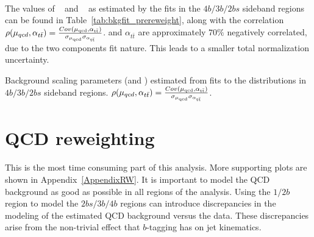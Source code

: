 \paragraph{}
The values of \muqcd~ and \alphatt~ as estimated by the fits in the $4b/3b/2bs$ sideband regions can be found in Table~\ref{tab:bkgfit_prereweight}, along with the correlation $\rho(\mu_{qcd},\alpha_{t\bar{t}}) = \frac{Cov(\rm \mu_{qcd},\rm \alpha_{\rm t\bar{t}})}{\rm \sigma_{\mu_{qcd}} \rm \sigma_{\alpha_{\rm t\bar{t}}} }$. 
\muqcd and $\alpha_{t\bar{t}}$ are approximately $70\%$ negatively correlated, due to the two components fit nature.
This leads to a smaller total normalization uncertainty.

\begin{table}[htbp!]
\begin{center}

\caption{Background scaling parameters (\muqcd and \alphatt) estimated from fits to the \mleadJ distributions in $4b/3b/2bs$ sideband regions. $\rho(\mu_{qcd},\alpha_{t\bar{t}}) = \frac{Cov(\rm \mu_{qcd},\rm \alpha_{\rm t\bar{t}})}{\rm \sigma_{\mu_{qcd}} \rm \sigma_{\alpha_{\rm t\bar{t}}} }$.}
\label{tab:bkgfit_prereweight}
\end{center}
\end{table}



\section{QCD reweighting}
\label{sec:boosted-reweight}

\paragraph{}
This is the most time consuming part of this analysis. 
More supporting plots are shown in Appendix~\ref{AppendixRW}.
It is important to model the QCD background as good as possible in all regions of the analysis.
Using the $1/2b$ region to model the $2bs/3b/4b$ regions can introduce discrepancies in the modeling of the estimated QCD background versus the data. 
These discrepancies arise from the non-trivial effect that $b$-tagging has on jet kinematics.


